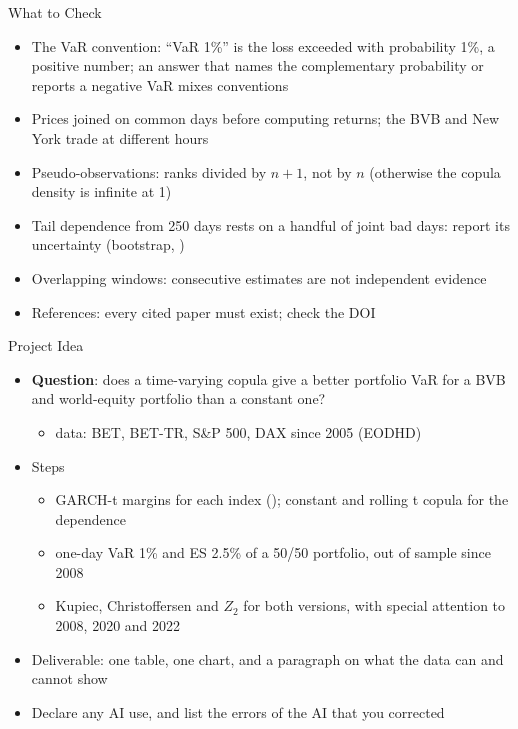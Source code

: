 \begin{frame}{What to Check}
\itemsize{\small}
\begin{itemize}
    \item The VaR convention: ``VaR 1\%'' is the loss exceeded with probability 1\%, a positive number; an answer that names the complementary probability or reports a negative VaR mixes conventions
    \item Prices joined on common days before computing returns; the BVB and New York trade at different hours
    \item Pseudo-observations: ranks divided by $n + 1$, not by $n$ (otherwise the copula density is infinite at 1)
    \item Tail dependence from 250 days rests on a handful of joint bad days: report its uncertainty (bootstrap, )
    \item Overlapping windows: consecutive estimates are not independent evidence
    \item References: every cited paper must exist; check the DOI
\end{itemize}
\end{frame}

\begin{frame}{Project Idea}
\itemsize{\small}
\begin{itemize}
    \item \textbf{Question}: does a time-varying copula give a better portfolio VaR for a BVB and world-equity portfolio than a constant one?
    \begin{itemize}
        \item data: BET, BET-TR, S\&P 500, DAX since 2005 (EODHD)
    \end{itemize}
    \item Steps
    \begin{itemize}
        \item GARCH-t margins for each index (); constant and rolling t copula for the dependence
        \item one-day VaR 1\% and ES 2.5\% of a 50/50 portfolio, out of sample since 2008
        \item Kupiec, Christoffersen and $Z_2$ for both versions, with special attention to 2008, 2020 and 2022
    \end{itemize}
    \item Deliverable: one table, one chart, and a paragraph on what the data can and cannot show
    \item Declare any AI use, and list the errors of the AI that you corrected
\end{itemize}
\end{frame}


